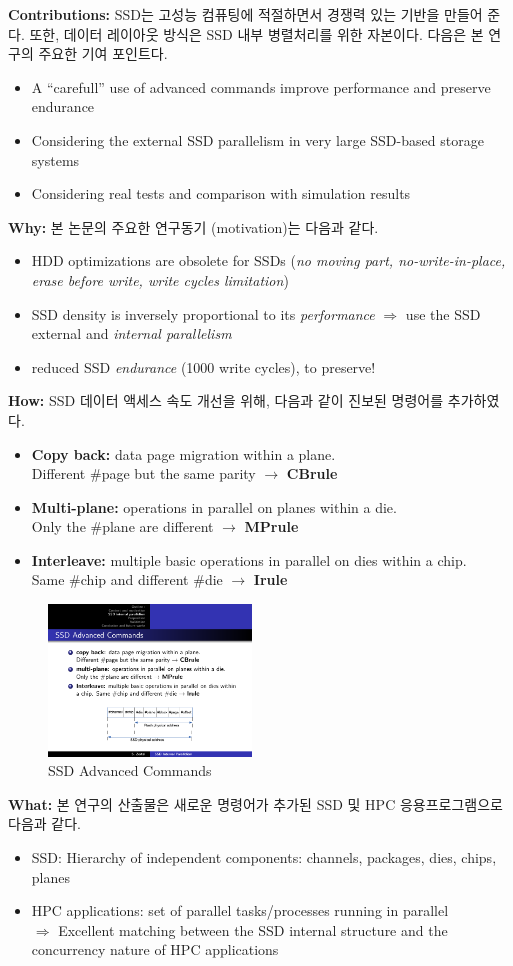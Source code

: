 \documentclass[twocolumn]{article}
\newcommand{\bi}{\begin{itemize}}
\newcommand{\ei}{\end{itemize}}
\newcommand{\ii}{\item}
\begin{document}
\noindent
\textbf{Contributions:}  SSD는 고성능 컴퓨팅에 적절하면서 경쟁력 있는 기반을 만들어 준다. 또한, 데이터 레이아웃 방식은 SSD 내부 병렬처리를 위한 자본이다. 다음은 본 연구의 주요한 기여 포인트다.
\bi
\ii A “carefull” use of advanced commands improve performance and preserve endurance
\ii Considering the external SSD parallelism in very large SSD-based storage systems
\ii Considering real tests and comparison with simulation results
\ei

\noindent
\textbf{Why:}  본 논문의 주요한 연구동기 (motivation)는 다음과 같다.
\bi
\ii HDD optimizations are obsolete for SSDs (\textit{no moving part, no-write-in-place, erase before write, write cycles limitation})
\ii SSD density is inversely proportional to its \textit{performance} $\Rightarrow$ use the SSD external and \textit{internal parallelism}
\ii  reduced SSD \textit{endurance} (1000 write cycles), to preserve!
\ei

\noindent
\textbf{How:} SSD 데이터 액세스 속도 개선을 위해, 다음과 같이 진보된 명령어를 추가하였다.
\bi 
\ii \textbf{Copy back:} data page migration within a plane.\\
Different \#page but the same parity $\rightarrow$ \textbf{CBrule}
\ii \textbf{Multi-plane:} operations in parallel on planes within a die.\\
Only the \#plane are different $\rightarrow$ \textbf{MPrule}
\ii \textbf{Interleave:} multiple basic operations in parallel on dies within a chip.\\ 
Same \#chip and different \#die $\rightarrow$ \textbf{Irule}
\ei
\begin{figure}[htb]
        \centering
        \includegraphics[width=0.48\textwidth]{ssd-commands.pdf}
        \caption{SSD Advanced Commands}
        \label{fig:ssdcomm}
\end{figure}

\noindent
\textbf{What:} 본 연구의 산출물은 새로운 명령어가 추가된 SSD 및 HPC 응용프로그램으로 다음과 같다.
\bi  
\ii SSD: Hierarchy of independent components: channels, packages, dies, chips, planes
\ii HPC applications: set of parallel tasks/processes running in parallel \\
$\Rightarrow$ Excellent matching between the SSD internal structure and the concurrency nature of HPC applications
\ei
\end{document}
